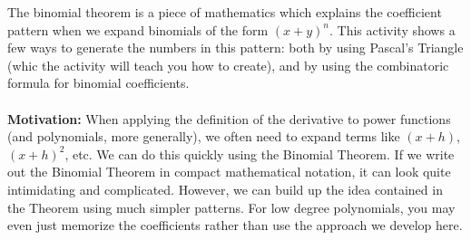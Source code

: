 \documentclass{ximera}
\begin{document}
 The binomial theorem is a piece of mathematics which explains the coefficient pattern when we expand binomials of the form $(x+y)^n$.  This activity shows a few ways to generate the numbers in this pattern: both by using Pascal's Triangle (whic the activity will teach you how to create), and by using the combinatoric formula for binomial coefficients.\\
 \\
 \textbf{Motivation:} When applying the definition of the derivative to power functions (and polynomials, more generally), we often need to expand terms like $(x+h)$, $(x+h)^2$, etc.  We can do this quickly using the Binomial Theorem.  If we write out the Binomial Theorem in compact mathematical notation, it can look quite intimidating and complicated.  However, we can build up the idea contained in the Theorem using much simpler patterns.  For low degree polynomials, you may even just memorize the coefficients rather than use the approach we develop here.
\end{document}
